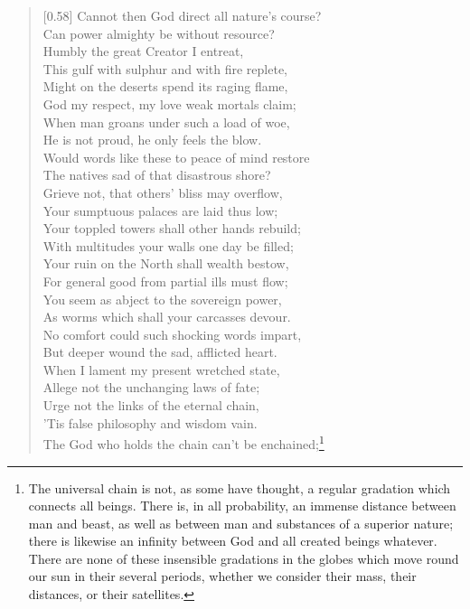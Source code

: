 \begin{verse}[0.58\textwidth]
Cannot then God direct all nature's course?\\
Can power almighty be without resource?\\
Humbly the great Creator I entreat,\\
This gulf with sulphur and with fire replete,\\
Might on the deserts spend its raging flame,\\
God my respect, my love weak mortals claim;\\
When man groans under such a load of woe,\\
He is not proud, he only feels the blow.\\
Would words like these to peace of mind restore\\
The natives sad of that disastrous shore?\\
Grieve not, that others' bliss may overflow,\\
Your sumptuous palaces are laid thus low;\\
Your toppled towers shall other hands rebuild;\\
With multitudes your walls one day be filled;\\
Your ruin on the North shall wealth bestow,\\
For general good from partial ills must flow;\\
You seem as abject to the sovereign power,\\
As worms which shall your carcasses devour.\\
No comfort could such shocking words impart,\\
But deeper wound the sad, afflicted heart.\\
When I lament my present wretched state,\\
Allege not the unchanging laws of fate;\\
Urge not the links of the eternal chain,\\
'Tis false philosophy and wisdom vain.\\
The God who holds the chain can't be enchained;\footnote{The
universal chain is not, as some have thought, a regular gradation
which connects all beings. There is, in all probability, an immense
distance between man and beast, as well as between man and substances
of a superior nature; there is likewise an infinity between God and
all created beings whatever. There are none of these insensible
gradations in the globes which move round our sun in their several
periods, whether we consider their mass, their distances, or their
satellites.

}
\end{verse}
